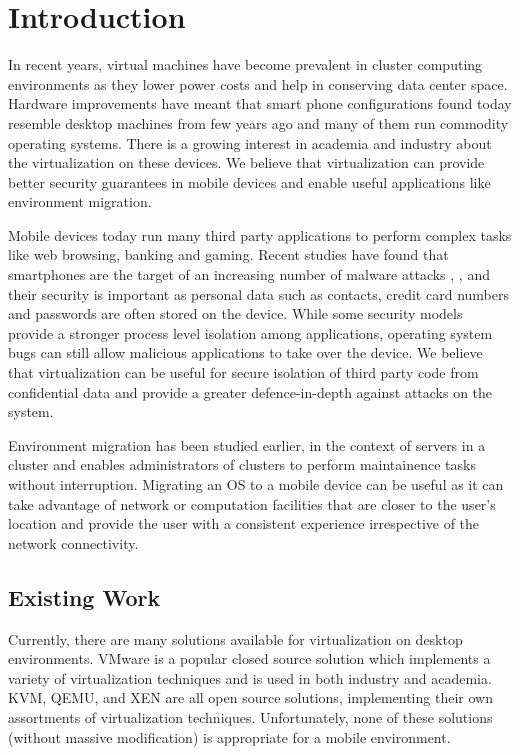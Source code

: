 \section{Introduction}
In recent years, virtual machines have become prevalent in cluster computing environments \cite{gartner2009virtual} as they lower power costs and help in conserving data center space. Hardware improvements have meant that smart phone configurations found today resemble desktop machines from few years ago and many of them run commodity operating systems. There is a growing interest in academia \cite{cox2007pocket} and industry \cite{vmware2009nextfrontier} about the virtualization on these devices. We believe that virtualization can provide better security guarantees in mobile devices and enable useful applications like environment migration.

Mobile devices today run many third party applications to perform complex tasks like web browsing, banking and gaming. Recent studies have found that smartphones are the target of an increasing number of malware attacks \cite{bose2006mobile},  \cite{cybercriminals2007banks},  \cite{iphone2010seriot} and their security is important as personal data such as contacts, credit card numbers and passwords are often stored on the device. While some security models \cite{androidsecurity} provide a stronger process level isolation among applications, operating system bugs \cite{kernel2009vulnerability} can still allow malicious applications to take over the device. We believe that virtualization can be useful for secure isolation of third party code from confidential data and provide a greater defence-in-depth against attacks on the system.

Environment migration has been studied earlier, in the context of servers in a cluster \cite{clark2005live} and enables administrators of clusters to perform maintainence tasks without interruption. Migrating an OS to a mobile device can be useful as it can take advantage of network or computation facilities that are closer to the user's location and provide the user with a consistent experience irrespective of the network connectivity. 

\subsection{Existing Work}
Currently, there are many solutions available for virtualization on desktop environments.  VMware is a popular closed source solution which implements a variety of virtualization techniques and is used in both industry and academia.  KVM, QEMU, and XEN are all open source solutions, implementing their own assortments of virtualization techniques.  Unfortunately, none of these solutions (without massive modification) is appropriate for a mobile environment.

